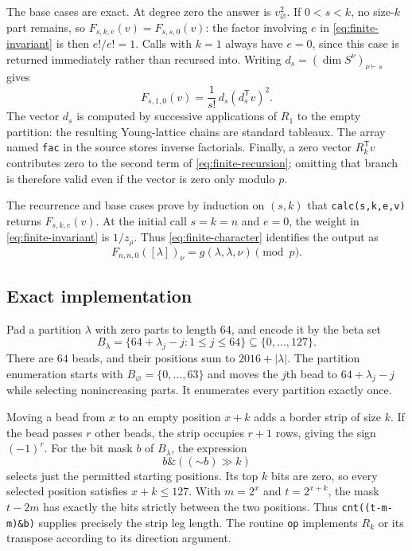 The base cases are exact.  At degree zero the answer is $v_\varnothing^2$.
If $0<s<k$, no size-$k$ part remains, so
$F_{s,k,e}(v)=F_{s,s,0}(v)$: the factor involving $e$ in
\eqref{eq:finite-invariant} is then $e!/e!=1$.  Calls with $k=1$ always have
$e=0$, since this case is returned immediately rather than recursed into.
Writing $d_s=(\dim S^\nu)_{\nu\vdash s}$ gives
\begin{equation}\label{eq:finite-base}
 F_{s,1,0}(v)=\frac{1}{s!}\,d_s(d_s^{\mathsf T}v)^2.
\end{equation}
The vector $d_s$ is computed by successive applications of $R_1$ to the
empty partition: the resulting Young-lattice chains are standard tableaux.
The array named \texttt{fac} in the source stores inverse factorials.
Finally, a zero vector $R_k^{\mathsf T}v$ contributes zero to the second
term of \eqref{eq:finite-recursion}; omitting that branch is therefore
valid even if the vector is zero only modulo $p$.

The recurrence and base cases prove by induction on $(s,k)$ that
\texttt{calc(s,k,e,v)} returns $F_{s,k,e}(v)$.
At the initial call $s=k=n$ and $e=0$, the weight in
\eqref{eq:finite-invariant} is $1/z_\rho$. Thus
\eqref{eq:finite-character} identifies the output as
\begin{equation}\label{eq:finite-output}
 F_{n,n,0}([\lambda])_\nu
   =g(\lambda,\lambda,\nu)\pmod p.
\end{equation}

\subsection{Exact implementation}

Pad a partition $\lambda$ with zero parts to length $64$, and encode it by
the beta set
\[
 B_\lambda=\{64+\lambda_j-j:1\leq j\leq64\}
          \subseteq\{0,\ldots,127\}.
\]
There are $64$ beads, and their positions sum to $2016+|\lambda|$.
The partition enumeration starts with $B_\varnothing=\{0,\ldots,63\}$
and moves the $j$th bead to $64+\lambda_j-j$ while selecting nonincreasing
parts.  It enumerates every partition exactly once.

Moving a bead from $x$ to an empty position $x+k$ adds a border strip of
size $k$.  If the bead passes $r$ other beads, the strip occupies $r+1$
rows, giving the sign $(-1)^r$.  For the bit mask $b$ of $B_\lambda$, the
expression
\[
 b\mathbin{\&}((\mathord{\sim}b)\mathbin{\gg}k)
\]
selects just the permitted starting positions.  Its top $k$ bits are zero,
so every selected position satisfies $x+k\leq127$.  With $m=2^x$ and
$t=2^{x+k}$, the mask $t-2m$ has exactly the bits strictly between the two
positions.  Thus \texttt{cnt((t-m-m)\&b)} supplies precisely the strip leg
length.  The routine \texttt{op} implements $R_k$ or its transpose according
to its direction argument.


